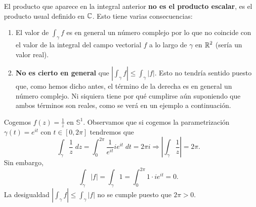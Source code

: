\begin{observation}
El producto que aparece en la integral anterior \textbf{no es el producto escalar}, es el producto usual definido en $\displaystyle \mathbb{C} $. Esto tiene varias consecuencias:
\begin{enumerate}
\item El valor de $\displaystyle \int _{\gamma }f $ es en general un número complejo por lo que no coincide con el valor de la integral del campo vectorial $\displaystyle f $ a lo largo de $\displaystyle \gamma  $ en $\displaystyle \mathbb{R}^{2} $ (sería un valor real).
\item \textbf{No es cierto en general} que $\displaystyle \left|\int _{\gamma }f \right|\leq \int _{\gamma } \left|f\right| $. Esto no tendría sentido puesto que, como hemos dicho antes, el término de la derecha es en general un número complejo. Ni siquiera tiene por qué cumplirse aún suponiendo que ambos términos son reales, como se verá en un ejemplo a continuación. 
\end{enumerate}
\end{observation}
\begin{eg}
	Cogemos $\displaystyle f\left(z\right)=\frac{1}{z} $ en $\displaystyle \mathbb{S}^{1} $. Observamos que si cogemos la parametrización $\displaystyle \gamma\left(t\right)=e^{it} $ con $\displaystyle t \in \left[0, 2\pi \right]  $ tendremos que 
	\[\int _{\gamma }\frac{1}{z} \; dz = \int^{2\pi }_{0} \frac{1}{e^{it}}ie^{it} \; dt = 2\pi i \Rightarrow  \left|\int _{\gamma }\frac{1}{z} \right|=2\pi.\]
Sin embargo, 
\[\int_{\gamma} \left|f\right| = \int _{\gamma }1 =\int^{2\pi }_{0} 1 \cdot ie^{it} =0 .\]
La desigualdad $\displaystyle \left|\int _{\gamma }f \right|\leq \int _{\gamma } \left|f\right| $ no se cumple puesto que $\displaystyle 2\pi > 0 $. 
\end{eg}

